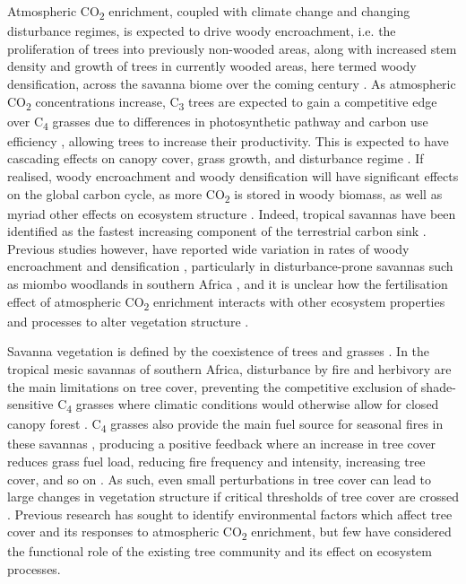 \begin{refsection}
Atmospheric CO\textsubscript{2} enrichment, coupled with climate change and changing disturbance regimes, is expected to drive woody encroachment, i.e. the proliferation of trees into previously non-wooded areas, along with increased stem density and growth of trees in currently wooded areas, here termed woody densification, across the savanna biome over the coming century \citep{Mitchard2013, Criado2020, Stevens2017}. As atmospheric CO\textsubscript{2} concentrations increase, C\textsubscript{3} trees are expected to gain a competitive edge over C\textsubscript{4} grasses due to differences in photosynthetic pathway and carbon use efficiency \citep{Buitenwerf2012}, allowing trees to increase their productivity. This is expected to have cascading effects on canopy cover, grass growth, and disturbance regime \citep{Bond2012}. If realised, woody encroachment and woody densification will have significant effects on the global carbon cycle, as more CO\textsubscript{2} is stored in woody biomass, as well as myriad other effects on ecosystem structure \citep{Donohue2013}. Indeed, tropical savannas have been identified as the fastest increasing component of the terrestrial carbon sink \citep{Sitch2015}. Previous studies however, have reported wide variation in rates of woody encroachment and densification \citep{Mitchard2013}, particularly in disturbance-prone savannas such as miombo woodlands in southern Africa \citep{Axelsson2018}, and it is unclear how the fertilisation effect of atmospheric CO\textsubscript{2} enrichment interacts with other ecosystem properties and processes to alter vegetation structure \citep{Korner2017, Reich2014}.

Savanna vegetation is defined by the coexistence of trees and grasses \citep{Scholes1997}. In the tropical mesic savannas of southern Africa, disturbance by fire and herbivory are the main limitations on tree cover, preventing the competitive exclusion of shade-sensitive C\textsubscript{4} grasses where climatic conditions would otherwise allow for closed canopy forest \citep{Sankaran2005}. C\textsubscript{4} grasses also provide the main fuel source for seasonal fires in these savannas \citep{Frost1996}, producing a positive feedback where an increase in tree cover reduces grass fuel load, reducing fire frequency and intensity, increasing tree cover, and so on \citep{Staver2015}. As such, even small perturbations in tree cover can lead to large changes in vegetation structure if critical thresholds of tree cover are crossed \citep{Hirota2011}. Previous research has sought to identify environmental factors which affect tree cover and its responses to atmospheric CO\textsubscript{2} enrichment, but few have considered the functional role of the existing tree community and its effect on ecosystem processes.


\end{refsection}
